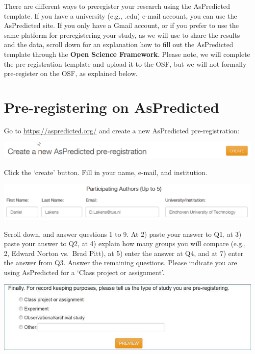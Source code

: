 \documentclass[
  oneside]{book}
\begin{document}
There are different ways to preregister your research using the AsPredicted template. If you have a university (e.g., .edu) e-mail account, you can use the AsPredicted site. If you only have a Gmail account, or if you prefer to use the same platform for preregistering your study, as we will use to share the results and the data, scroll down for an explanation how to fill out the AsPredicted template through the \textbf{Open Science Framework}. Please note, we will complete the pre-registration template and upload it to the OSF, but we will not
formally pre-register on the OSF, as explained below.

\hypertarget{pre-registering-on-aspredicted}{%
\section{Pre-registering on AsPredicted}\label{pre-registering-on-aspredicted}}

Go to \url{https://aspredicted.org/} and create a new AsPredicted pre-registration:

\begin{center}\includegraphics[width=1\linewidth]{images/9fafdf4597839aeb44b3882aace1133e} \end{center}

Click the `create' button. Fill in your name, e-mail, and institution.

\begin{center}\includegraphics[width=1\linewidth]{images/1308ce9af6a5ebe700b8ff58542bdab2} \end{center}

Scroll down, and answer questions 1 to 9. At 2) paste your answer to Q1, at 3)
paste your answer to Q2, at 4) explain how many groups you will compare (e.g.,
2, Edward Norton vs.~Brad Pitt), at 5) enter the answer at Q4, and at 7) enter
the answer from Q3. Answer the remaining questions. Please indicate you are
using AsPredicted for a `Class project or assignment'.

\begin{center}\includegraphics[width=1\linewidth]{images/aedb89e7e45561843864302129f6cbd6} \end{center}
\end{document}
